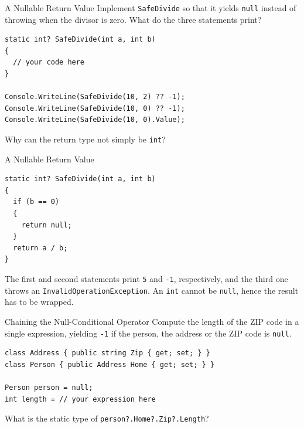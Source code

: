 \begin{exerciseframe}{A Nullable Return Value}
  Implement \texttt{SafeDivide} so that it yields \texttt{null} instead of
  throwing when the divisor is zero. What do the three statements print?
  \vspace{1ex}

  \begin{lstlisting}[basicstyle=\scriptsize\ttfamily]
static int? SafeDivide(int a, int b)
{
  // your code here
}

Console.WriteLine(SafeDivide(10, 2) ?? -1);
Console.WriteLine(SafeDivide(10, 0) ?? -1);
Console.WriteLine(SafeDivide(10, 0).Value);
  \end{lstlisting}
  \vspace{1ex}

  Why can the return type not simply be \texttt{int}?
\end{exerciseframe}

\begin{solutionframe}{A Nullable Return Value}
  \begin{lstlisting}[basicstyle=\scriptsize\ttfamily]
static int? SafeDivide(int a, int b)
{
  if (b == 0)
  {
    return null;
  }
  return a / b;
}
  \end{lstlisting}
  The first and second statements print \texttt{5} and \texttt{-1}, respectively, and the third one
  throws an \texttt{InvalidOperationException}. An \texttt{int} cannot be
  \texttt{null}, hence the result has to be wrapped.
  \vspace{1ex}
  \vspace{3ex}

\end{solutionframe}

\begin{exerciseframe}{Chaining the Null-Conditional Operator}
  Compute the length of the ZIP code in a single expression, yielding
  \texttt{-1} if the person, the address or the ZIP code is \texttt{null}.
  \vspace{1ex}

  \begin{lstlisting}[basicstyle=\scriptsize\ttfamily]
class Address { public string Zip { get; set; } }
class Person { public Address Home { get; set; } }

Person person = null;
int length = // your expression here
  \end{lstlisting}
  \vspace{1ex}

  What is the static type of \texttt{person?.Home?.Zip?.Length}?
\end{exerciseframe}

